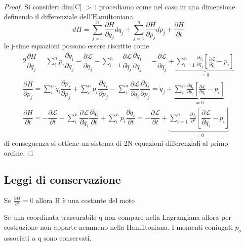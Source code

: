 \begin{proof}
	Si consideri dim[C] $>1$ procediamo come nel caso in una dimensione definendo il differenziale dell'Hamiltoniana
\begin{equation*}
	d H=\sum_{j=1}^n \frac{\partial H}{\partial q_j} d q_j+\sum_{j=1}^n \frac{\partial H}{\partial p_j} d p_j+\frac{\partial H}{\partial t}
\end{equation*}
le j-sime equazioni possono essere riscritte come 
	\begin{alignat*}{2}
		\dfrac{\partial H}{\partial q_j}=\sum_i^n p_i \dfrac{\partial \dot{q}_i}{\partial q_j}-\dfrac{\partial \mathcal{L}}{\partial q_j}-\sum_{i=1}^n \dfrac{\partial \mathcal{L}}{\partial \dot{q}_j} \dfrac{\partial \dot{q}_i}{\partial q_j} = -\dfrac{\partial \mathcal{L}}{\partial q_j}+\underbrace{\sum_{i=1}^n \frac{\partial \dot{q}_i}{\partial q_j}\left[\frac{\partial \mathcal{L}}{\partial \dot{q}_i}-p_i\right]}_{=0} \\[0.05cm]
		\dfrac{\partial H}{\partial p_j}=\sum_i^n \dot{q}_i \dfrac{\partial p_i}{\partial p_j}+\sum_i^n p_i \dfrac{\partial \dot{q}_i}{\partial p_j}-\sum_i^n \dfrac{\partial \mathcal{L}}{\partial \dot{q}_i} \dfrac{\partial \dot{q}_i}{\partial p_j} = \dot{q}_j + \underbrace{\sum_i^n \frac{\partial \dot{q}_i}{\partial p_j}\left[\frac{\partial \mathcal{L}}{\partial \dot{q}_i}-p_i\right]}_{=0}\\[0.05cm]
		\dfrac{\partial H}{\partial t}=-\dfrac{\partial \mathcal{L}}{\partial t}-\sum_i^n \dfrac{\partial \mathcal{L}}{\partial \dot{q}_i} \dfrac{\partial \dot{q}_i}{\partial t}+\sum_i^n p_i \dfrac{\partial \dot{q}_i}{\partial t} = -\dfrac{\partial \mathcal{L}}{\partial t}+\underbrace{\sum_{i=1}^n \frac{\partial \dot{q}_i}{\partial t}\left[\dfrac{\partial \mathcal{L}}{\partial \dot{q}_i}-p_i\right]}_{=0}
	\end{alignat*}
di conseguenza si ottiene un sistema di 2N equazioni differenziali al primo ordine.
\end{proof}

\subsection{Leggi di conservazione}

\begin{lemma}
Se $\frac{\partial H}{\partial t} = 0$ allora H \`{e} una costante del moto
\end{lemma}

\begin{lemma}
	Se una coordinata trascurabile q non compare nella Lagrangiana allora per costruzione non apparte nemmeno nella Hamiltoniana. I momenti coniugati $p_q$ associati a q sono conservati.
\end{lemma}


